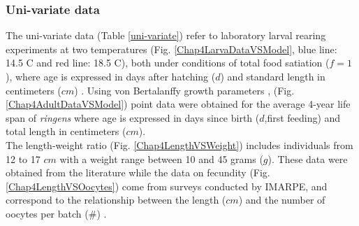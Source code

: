 \subsubsection{Uni-variate data}

The uni-variate data (Table \ref{uni-variate}) refer to laboratory larval rearing experiments at two temperatures (Fig. \ref{Chap4LarvaDataVSModel}, blue line: 14.5 \textdegree C and red line: 18.5 \textdegree C), both under conditions of total food satiation ($f=1$), where age is expressed in days after hatching ($d$) and standard length in centimeters ($cm$) \citep{RiouOfel2021}. Using von Bertalanffy growth parameters \citep{PaloMuck1987}, (Fig. \ref{Chap4AdultDataVSModel}) point data were obtained for the average 4-year life span of \textit{\gls{ringens}} where age is expressed in days since birth ($d$,first feeding) and total length in centimeters ($cm$).\\

The length-weight ratio (Fig. \ref{Chap4LengthVSWeight}) includes individuals from 12 to 17 $cm$ with a weight range between 10 and 45 grams ($g$). These data were obtained from the literature \citep{Mina1968} while the data on fecundity (Fig. \ref{Chap4LengthVSOocytes}) come from surveys conducted by IMARPE, and correspond to the relationship between the length ($cm$) and the number of oocytes per batch ($\#$) \citep{PereBuit2000}.

